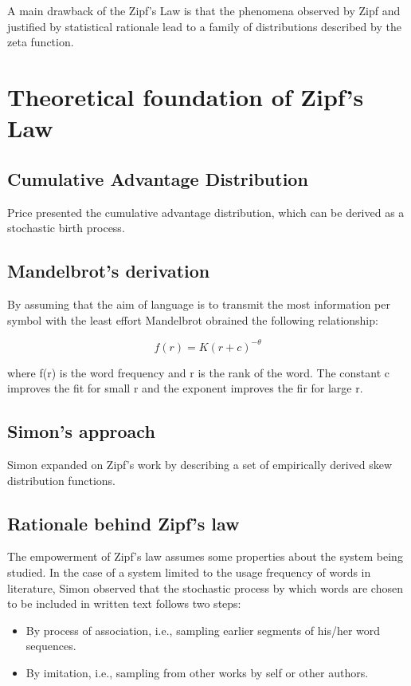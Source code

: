 \documentclass{article}
\begin{document}
A main drawback of the Zipf's Law is that the phenomena observed by
Zipf and justified by statistical rationale lead to a family of
distributions described by the zeta function.

\section{Theoretical foundation of Zipf's Law}
\subsection{Cumulative Advantage Distribution}

Price presented the cumulative advantage distribution, which can be
derived as a stochastic birth process.

\subsection{Mandelbrot's derivation}

By assuming that the aim of language is to transmit the most
information per symbol with the least effort Mandelbrot obrained the
following relationship:

\begin{equation}
  \label{simple_equation}
  f(r) = K(r+c)^{-\theta}
\end{equation}

where f(r) is the word frequency and r is the rank of the word. The
constant c improves the fit for small r and the exponent improves the
fir for large r.

\subsection{Simon's approach}

Simon expanded on Zipf's work by describing a set of empirically
derived skew distribution functions.

\subsection{Rationale behind Zipf's law}

The empowerment of Zipf's law assumes some properties about the
system being studied. In the case of a system limited to the usage
frequency of words in literature, Simon observed that the stochastic
process by which words are chosen to be included in written text
follows two steps:

\begin{itemize}
  \item By process of association, i.e., sampling earlier segments of his/her word sequences.
  \item By imitation, i.e., sampling from other works by self or other authors.
\end{itemize}
\end{document}
